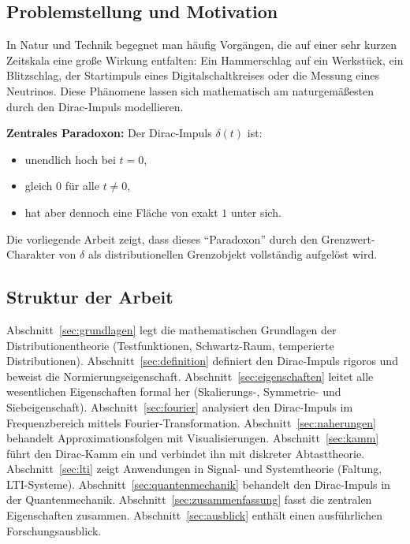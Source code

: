 ﻿\documentclass[a4paper,12pt]{article}
\theoremstyle{definition}
\begin{document}
\subsection{Problemstellung und Motivation}

In Natur und Technik begegnet man h\"aufig Vorg\"angen, die auf einer sehr kurzen Zeitskala
eine gro{\ss}e Wirkung entfalten: Ein Hammerschlag auf ein Werkst\"uck, ein Blitzschlag, der
Startimpuls eines Digitalschaltkreises oder die Messung eines Neutrinos. Diese Ph\"anomene
lassen sich mathematisch am naturgem\"a{\ss}esten durch den Dirac-Impuls modellieren.

\textbf{Zentrales Paradoxon:} Der Dirac-Impuls $\delta(t)$ ist:
\begin{itemize}
    \item unendlich hoch bei $t = 0$,
    \item gleich $0$ f\"ur alle $t \neq 0$,
    \item hat aber dennoch eine Fl\"ache von exakt $1$ unter sich.
\end{itemize}
Die vorliegende Arbeit zeigt, dass dieses ``Paradoxon'' durch den Grenzwert-Charakter von
$\delta$ als distributionellen Grenzobjekt vollst\"andig aufgel\"ost wird.

\subsection{Struktur der Arbeit}

Abschnitt~\ref{sec:grundlagen} legt die mathematischen Grundlagen der Distributionentheorie (Testfunktionen, Schwartz-Raum, temperierte Distributionen). Abschnitt~\ref{sec:definition} definiert den Dirac-Impuls rigoros und beweist die Normierungseigenschaft. Abschnitt~\ref{sec:eigenschaften} leitet alle wesentlichen Eigenschaften formal her (Skalierungs-, Symmetrie- und Siebeigenschaft). Abschnitt~\ref{sec:fourier} analysiert den Dirac-Impuls im Frequenzbereich mittels Fourier-Transformation. Abschnitt~\ref{sec:naherungen} behandelt Approximationsfolgen mit Visualisierungen. Abschnitt~\ref{sec:kamm} führt den Dirac-Kamm ein und verbindet ihn mit diskreter Abtasttheorie. Abschnitt~\ref{sec:lti} zeigt Anwendungen in Signal- und Systemtheorie (Faltung, LTI-Systeme). Abschnitt~\ref{sec:quantenmechanik} behandelt den Dirac-Impuls in der Quantenmechanik. Abschnitt~\ref{sec:zusammenfassung} fasst die zentralen Eigenschaften zusammen. Abschnitt~\ref{sec:ausblick} enthält einen ausführlichen Forschungsausblick.

\end{document}
